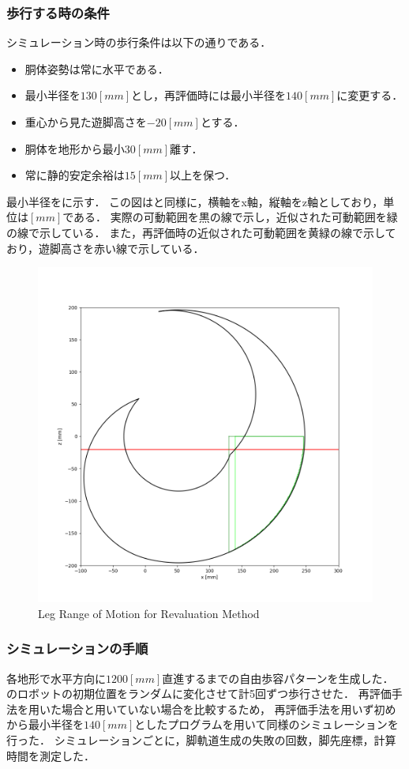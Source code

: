 \subsubsection{歩行する時の条件}
シミュレーション時の歩行条件は以下の通りである．
\begin{itemize}
  \item 胴体姿勢は常に水平である．
  \item 最小半径を$130 [mm]$とし，再評価時には最小半径を$140 [mm]$に変更する．
  \item 重心から見た遊脚高さを$-20 [mm]$とする．
  \item 胴体を地形から最小$30 [mm]$離す．
  \item 常に静的安定余裕は$15 [mm]$以上を保つ．
\end{itemize}
最小半径をに示す．
この図はと同様に，横軸をx軸，縦軸をz軸としており，単位は$[mm]$である．
実際の可動範囲を黒の線で示し，近似された可動範囲を緑の線で示している．
また，再評価時の近似された可動範囲を黄緑の線で示しており，遊脚高さを赤い線で示している．

\begin{figure}[htbp]
  \centering
  \includegraphics[width=0.5\linewidth,trim={30 30 30 30}, clip]{figure/chapter4/revaluation_view.png}
  \caption{Leg Range of Motion for Revaluation Method}
  \label{fig:ch5_range_revaluation} %
\end{figure}

\subsubsection{シミュレーションの手順}
各地形で水平方向に$1200 [mm]$直進するまでの自由歩容パターンを生成した．
のロボットの初期位置をランダムに変化させて計5回ずつ歩行させた．
再評価手法を用いた場合と用いていない場合を比較するため，
再評価手法を用いず初めから最小半径を$140 [mm]$としたプログラムを用いて同様のシミュレーションを行った．
シミュレーションごとに，脚軌道生成の失敗の回数，脚先座標，計算時間を測定した．


